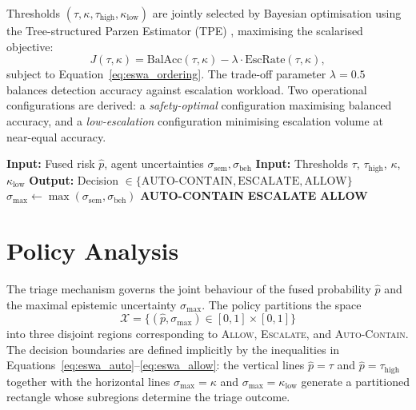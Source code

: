 Thresholds $(\tau, \kappa, \tau_\text{high}, \kappa_\text{low})$ are jointly selected by Bayesian optimisation using the Tree-structured Parzen Estimator (TPE) \cite{optuna2019}, maximising the scalarised objective:
\begin{equation}
J(\tau, \kappa) = \text{BalAcc}(\tau, \kappa) - \lambda \cdot \text{EscRate}(\tau, \kappa),
\label{eq:eswa_objective}
\end{equation}
subject to Equation~\eqref{eq:eswa_ordering}. The trade-off parameter $\lambda = 0.5$ balances detection accuracy against escalation workload. Two operational configurations are derived: a \emph{safety-optimal} configuration maximising balanced accuracy, and a \emph{low-escalation} configuration minimising escalation volume at near-equal accuracy.

\begin{algorithm}[ht]
\caption{Uncertainty-Aware Triage Policy}
\label{alg:eswa_triage}
\begin{algorithmic}[1]
    \State \textbf{Input:} Fused risk $\hat{p}$, agent uncertainties $\sigma_{\text{sem}}, \sigma_{\text{beh}}$
    \State \textbf{Input:} Thresholds $\tau$, $\tau_{\text{high}}$, $\kappa$, $\kappa_{\text{low}}$
    \State \textbf{Output:} Decision $\in \{\text{AUTO-CONTAIN}, \text{ESCALATE}, \text{ALLOW}\}$
    \State $\sigma_{\max} \gets \max(\sigma_{\text{sem}}, \sigma_{\text{beh}})$
        \State \Return \textbf{AUTO-CONTAIN} 
        \State \Return \textbf{ESCALATE} 
    \Else
        \State \Return \textbf{ALLOW} 
    \EndIf
\end{algorithmic}
\end{algorithm}


\section{Policy Analysis}
\label{sec:eswa_policyanalysis}

The triage mechanism governs the joint behaviour of the fused probability $\hat{p}$ and the maximal epistemic uncertainty $\sigma_\text{max}$. The policy partitions the space
\begin{equation}
\mathcal{X} = \bigl\{(\hat{p}, \sigma_\text{max}) \in [0,1] \times [0,1]\bigr\}
\label{eq:eswa_policyspace}
\end{equation}
into three disjoint regions corresponding to \textsc{Allow}, \textsc{Escalate}, and \textsc{Auto-Contain}. The decision boundaries are defined implicitly by the inequalities in Equations~\eqref{eq:eswa_auto}--\eqref{eq:eswa_allow}: the vertical lines $\hat{p} = \tau$ and $\hat{p} = \tau_\text{high}$ together with the horizontal lines $\sigma_\text{max} = \kappa$ and $\sigma_\text{max} = \kappa_\text{low}$ generate a partitioned rectangle whose subregions determine the triage outcome.

